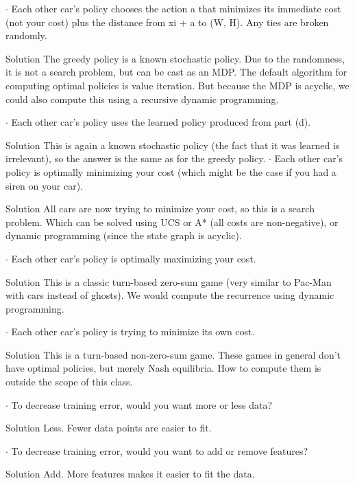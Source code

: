 \documentclass[4pt,landscape]{article}
\begin{document}
\begin{multicols*}{4}
{\color{purple}\hrulefill}\par
{$\cdot$ Each other car’s policy chooses the action a that minimizes its immediate
cost (not your cost) plus the distance from xi + a to (W, H). Any ties are broken
randomly.}\par
{{\color{purple}Solution} The greedy policy is a known stochastic policy. Due to the randomness,
it is not a search problem, but can be cast as an MDP. The default algorithm for
computing optimal policies is value iteration. But because the MDP is acyclic, we
could also compute this using a recursive dynamic programming.}\par
{$\cdot$ Each other car’s policy uses the learned policy produced from part (d).}\par
{{\color{purple}Solution} This is again a known stochastic policy (the fact that it was learned is
irrelevant), so the answer is the same as for the greedy policy.}
{$\cdot$ Each other car’s policy is optimally minimizing your cost (which might be
the case if you had a siren on your car).}\par
{{\color{purple}Solution} All cars are now trying to minimize your cost, so this is a search problem. Which can be solved using UCS or A* (all costs are non-negative), or dynamic
programming (since the state graph is acyclic).}\par
{$\cdot$ Each other car’s policy is optimally maximizing your cost.}\par
{{\color{purple}Solution} This is a classic turn-based zero-sum game (very similar to Pac-Man with
cars instead of ghosts). We would compute the recurrence using dynamic programming.}\par
{$\cdot$ Each other car’s policy is trying to minimize its own cost.}\par
{{\color{purple}Solution} This is a turn-based non-zero-sum game. These games in general don’t
have optimal policies, but merely Nash equilibria. How to compute them is outside
the scope of this class.}\par
{\color{purple}\hrulefill}\par
{$\cdot$ To decrease training error, would you want more or less data?}\par
{{\color{purple}Solution} Less. Fewer data points are easier to fit.}\par
{$\cdot$ To decrease training error, would you want to add or remove features?}\par
{{\color{purple}Solution} Add. More features makes it easier to fit the data.}\par

\end{multicols*}
\end{document}
